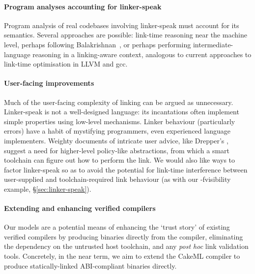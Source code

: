\documentclass[preprint,10pt]{sigplanconf-pldi16}
\begin{document}
% 

\paragraph{Program analyses accounting for linker-speak}
Program analysis of real codebases involving linker-speak must account for its semantics.
Several approaches are possible: link-time reasoning near the machine level, perhaps 
following Balakrishnan~\cite{balakrishnan-wysinwyx-2010},
or perhaps performing intermediate-language reasoning in a linking-aware context, analogous to 
current approaches to link-time optimisation in LLVM and \textsf{gcc}.

\paragraph{User-facing improvements}
Much of the user-facing complexity of linking can be argued as unnecessary.
Linker-speak is not a well-designed language: its incantations often implement simple properties using low-level mechanisms.
Linker behaviour (particularly errors) have a habit of mystifying programmers, even experienced language implementers. 
Weighty documents of intricate user advice, like Drepper's \cite{drepper_how_2011}, suggest a need for higher-level policy-like abstractions, from which a smart toolchain can figure out how to perform the link.
We would also like ways to factor linker-speak so as to avoid the potential for link-time interference between user-supplied and toolchain-required link behaviour 
(as with our \textsf{-fvisibility} example, \S\ref{sec:linker-speak}).

\paragraph{Extending and enhancing verified compilers}
Our models are a potential means of enhancing the `trust story' of existing verified compilers by producing binaries directly from the compiler, eliminating the dependency on the untrusted host toolchain, and any \emph{post hoc} link validation tools.
Concretely, in the near term, we aim to extend the CakeML compiler to produce statically-linked ABI-compliant binaries directly.
\end{document}

